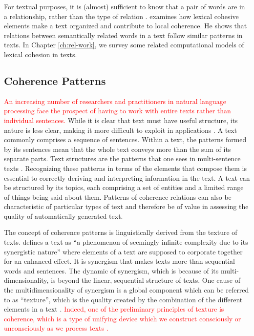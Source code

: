 For textual purposes, it is (almost) sufficient to know that a pair of words are in a relationship, rather than the type of relation \cite{halliday76}. %
 examines how lexical cohesive elements make a text organized and contribute to local coherence. 
He shows that relations between semantically related words in a text follow similar patterns in texts. 
In Chapter \ref{ch:rel-work}, we survey some related computational models of lexical cohesion in texts. 


\subsection{Coherence Patterns}

\textcolor{red}{An increasing number of researchers and practitioners in natural language processing face the prospect of having to work with entire texts rather than individual sentences. 
}
While it is clear that text must have useful structure, its nature is less clear, making it more difficult to exploit in applications \cite{webber12a}. 
A text commonly comprises a sequence of sentences. 
Within a text, the patterns formed by its sentences mean that the whole text conveys more than the sum of its separate parts. 
Text structures are the patterns that one sees in \mbox{multi-sentence} texts \cite{webber12a}. 
Recognizing these patterns in terms of the elements that compose them is essential to correctly deriving and interpreting information in the text. 
A text can be structured by its topics, each comprising a set of entities and a limited range of things being said about them. 
Patterns of coherence relations can also be characteristic of particular types of text and therefore be of value in assessing the quality of automatically generated text. 

The concept of coherence patterns is linguistically derived from the texture of texts. 
 defines a text as ``a phenomenon of seemingly infinite complexity due to its synergistic nature'' where elements of a text are supposed to corporate together for an enhanced effect. 
It is synergism that makes texts more than sequential words and sentences. 
The dynamic of synergism, which is because of its multi-dimensionality, is beyond the linear, sequential structure of texts. 
One cause of the multidimensionality of synergism is a global component which can be referred to as ``texture'', which is the quality created by the combination of the different elements in a text \cite{stoddard91}. 
\textcolor{red}{Indeed, one of the preliminary principles of texture is coherence, which is a type of unifying device which we construct consciously or unconsciously as we process texts \cite{halliday76}.}

